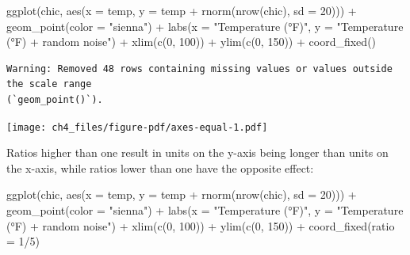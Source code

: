 \documentclass[
  letterpaper,
]{scrbook}
\newenvironment{Shaded}{\begin{snugshade}}{\end{snugshade}}
\newcommand{\AttributeTok}[1]{\textcolor[rgb]{0.40,0.45,0.13}{#1}}
\newcommand{\DecValTok}[1]{\textcolor[rgb]{0.68,0.00,0.00}{#1}}
\newcommand{\FunctionTok}[1]{\textcolor[rgb]{0.28,0.35,0.67}{#1}}
\newcommand{\NormalTok}[1]{\textcolor[rgb]{0.00,0.23,0.31}{#1}}
\newcommand{\SpecialCharTok}[1]{\textcolor[rgb]{0.37,0.37,0.37}{#1}}
\newcommand{\StringTok}[1]{\textcolor[rgb]{0.13,0.47,0.30}{#1}}
\begin{document}
\begin{Shaded}
\begin{Highlighting}[]
\FunctionTok{ggplot}\NormalTok{(chic, }\FunctionTok{aes}\NormalTok{(}\AttributeTok{x =}\NormalTok{ temp, }\AttributeTok{y =}\NormalTok{ temp }\SpecialCharTok{+} \FunctionTok{rnorm}\NormalTok{(}\FunctionTok{nrow}\NormalTok{(chic), }\AttributeTok{sd =} \DecValTok{20}\NormalTok{))) }\SpecialCharTok{+}
  \FunctionTok{geom\_point}\NormalTok{(}\AttributeTok{color =} \StringTok{"sienna"}\NormalTok{) }\SpecialCharTok{+}
  \FunctionTok{labs}\NormalTok{(}\AttributeTok{x =} \StringTok{"Temperature (°F)"}\NormalTok{, }\AttributeTok{y =} \StringTok{"Temperature (°F) + random noise"}\NormalTok{) }\SpecialCharTok{+}
  \FunctionTok{xlim}\NormalTok{(}\FunctionTok{c}\NormalTok{(}\DecValTok{0}\NormalTok{, }\DecValTok{100}\NormalTok{)) }\SpecialCharTok{+} \FunctionTok{ylim}\NormalTok{(}\FunctionTok{c}\NormalTok{(}\DecValTok{0}\NormalTok{, }\DecValTok{150}\NormalTok{)) }\SpecialCharTok{+}
  \FunctionTok{coord\_fixed}\NormalTok{()}
\end{Highlighting}
\end{Shaded}

\begin{verbatim}
Warning: Removed 48 rows containing missing values or values outside the scale range
(`geom_point()`).
\end{verbatim}

\texttt{[image: ch4\_files/figure-pdf/axes-equal-1.pdf]}

Ratios higher than one result in units on the y-axis being longer than
units on the x-axis, while ratios lower than one have the opposite
effect:

\begin{Shaded}
\begin{Highlighting}[]
\FunctionTok{ggplot}\NormalTok{(chic, }\FunctionTok{aes}\NormalTok{(}\AttributeTok{x =}\NormalTok{ temp, }\AttributeTok{y =}\NormalTok{ temp }\SpecialCharTok{+} \FunctionTok{rnorm}\NormalTok{(}\FunctionTok{nrow}\NormalTok{(chic), }\AttributeTok{sd =} \DecValTok{20}\NormalTok{))) }\SpecialCharTok{+}
  \FunctionTok{geom\_point}\NormalTok{(}\AttributeTok{color =} \StringTok{"sienna"}\NormalTok{) }\SpecialCharTok{+}
  \FunctionTok{labs}\NormalTok{(}\AttributeTok{x =} \StringTok{"Temperature (°F)"}\NormalTok{, }\AttributeTok{y =} \StringTok{"Temperature (°F) + random noise"}\NormalTok{) }\SpecialCharTok{+}
  \FunctionTok{xlim}\NormalTok{(}\FunctionTok{c}\NormalTok{(}\DecValTok{0}\NormalTok{, }\DecValTok{100}\NormalTok{)) }\SpecialCharTok{+} \FunctionTok{ylim}\NormalTok{(}\FunctionTok{c}\NormalTok{(}\DecValTok{0}\NormalTok{, }\DecValTok{150}\NormalTok{)) }\SpecialCharTok{+}
  \FunctionTok{coord\_fixed}\NormalTok{(}\AttributeTok{ratio =} \DecValTok{1}\SpecialCharTok{/}\DecValTok{5}\NormalTok{)}
\end{Highlighting}
\end{Shaded}
\end{document}
